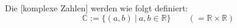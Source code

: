 Die [komplexe Zahlen] werden wie folgt definiert:
$$\mathbb{C} := \{(a, b) \ | \ a, b \in \mathbb{R}\} \qquad (= \mathbb{R} \times \mathbb{R})$$